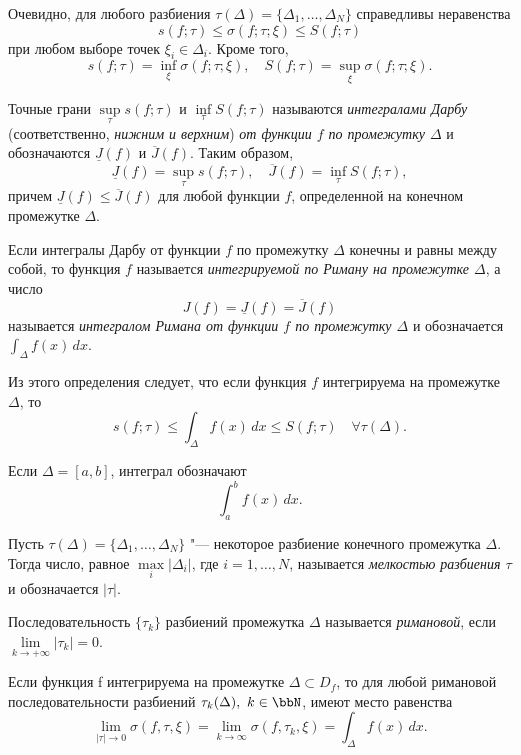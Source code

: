 Очевидно, для любого разбиения $\tau(\Delta) = \{ \Delta_1, \ldots, \Delta_N\}$ справедливы неравенства
$$
s(f; \tau) \le \sigma(f; \tau; \xi) \le S(f; \tau)
$$
при любом выборе точек $\xi_i \in \Delta_i$. Кроме того,
$$
s(f; \tau) = \inf_{\xi} \sigma(f; \tau; \xi), \quad S(f; \tau) = \sup_{\xi} \sigma(f; \tau; \xi).
$$

\begin{defn}
Точные грани $\sup\limits_{\tau} s(f; \tau)$ и $\inf\limits_{\tau} S(f; \tau)$ называются \textit{интегралами Дарбу} (соответственно, \textit{нижним и верхним}) \textit{от функции $f$ по промежутку $\Delta$} и обозначаются $\underline{J}(f)$ и $\overline{J}(f)$. Таким образом,
$$
\underline{J}(f) = \sup_{\tau} s(f; \tau), \quad \overline{J}(f) = \inf_{\tau} S(f; \tau),
$$
причем $\underline{J}(f) \le \overline{J}(f)$ для любой функции $f$, определенной на конечном промежутке 
$\Delta$.
\end{defn}


\begin{defn}
Если интегралы Дарбу от функции $f$ по промежутку $\Delta$ конечны и равны между собой, то функция $f$ называется \textit{интегрируемой по Риману на промежутке $\Delta$}, а число
$$
J(f) = \underline{J}(f) = \overline{J}(f)
$$
называется \textit{интегралом Римана от функции $f$ по промежутку $\Delta$} и обозначается $\int_{\Delta} f(x) \,dx$.
\end{defn}

Из этого определения следует, что если функция $f$ интегрируема на промежутке $\Delta$, то
$$
s(f; \tau) \le \int_{\Delta} f(x) \,dx \le S(f; \tau) \quad \forall \tau(\Delta).
$$

Если $\Delta = [a, b]$, интеграл обозначают $$\int_{a}^{b} f(x) \,dx.$$

\begin{defn}
Пусть $\tau(\Delta) = \{ \Delta_1, \ldots, \Delta_N\}$ "--- некоторое разбиение конечного промежутка $\Delta$. Тогда число, равное $\max\limits_i|\Delta_i|$, где $i=1,\ldots,N$, называется \textit{мелкостью разбиения $\tau$} и обозначается $|\tau|$.
\end{defn}

\begin{defn}
Последовательность $\{\tau_k\}$ разбиений промежутка $\Delta$ называется \textit{римановой}, если $\lim\limits_{k \to +\infty}|\tau_k|=0$.
\end{defn}

\begin{thm} \label{ch11.1thm1}
Если функция f интегрируема на промежутке $\Delta \subset D_f$, то для любой римановой последовательности разбиений $\tau_k(\Delta),\ k\in \bbN$, имеют место равенства
\begin{equation} \label{ch11.1eq1}
\lim_{|\tau| \to 0} \sigma(f, \tau, \xi) = \lim_{k \to \infty} \sigma(f, \tau_k, \xi) = \int_{\Delta} f(x) \,dx.
\end{equation}
\end{thm}

